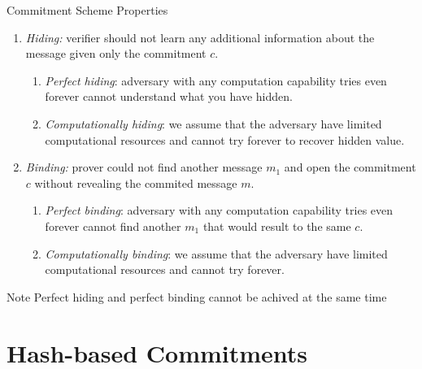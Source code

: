 \documentclass[xcolor={usenames,dvipsnames}]{beamer}
\begin{document}
    \begin{frame}{Commitment Scheme Properties}
        \begin{definition}
            \begin{enumerate}
                \item \textit{Hiding: } verifier should not learn any additional information about the message given only the commitment $c$.
                \begin{enumerate}
                    \item \textit{Perfect hiding}: adversary with any computation capability tries even forever cannot understand what you have hidden.
                    \item \textit{Computationally hiding}: we assume that the adversary have limited computational resources and cannot try forever to recover hidden value.
                \end{enumerate}
                
                \item \textit{Binding: } prover could not find another message $m_1$ and open the commitment $c$ without revealing the commited message $m$.
                \begin{enumerate}
                    \item \textit{Perfect binding}: adversary with any computation capability tries even forever cannot find another $m_1$ that would result to the same $c$.
                    \item \textit{Computationally binding}: we assume that the adversary have limited computational resources and cannot try forever.
                \end{enumerate}
            \end{enumerate}
        \end{definition}
        \begin{alertblock}{Note}
            Perfect hiding and perfect binding cannot be achived at the same time
        \end{alertblock}    
    \end{frame}

    \section{Hash-based Commitments}
\end{document}
